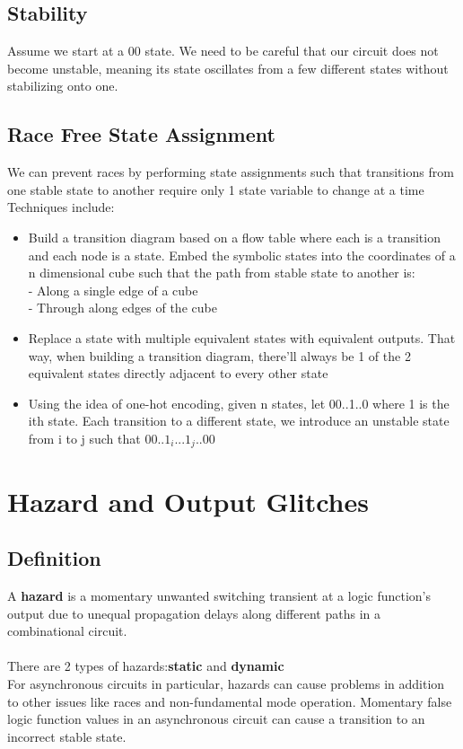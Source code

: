 \documentclass[12pt]{report}
\begin{document}
		\subsection{Stability}
			Assume we start at a 00 state. We need to be careful that our circuit does not become unstable, meaning its state oscillates from a few different states without stabilizing onto one.
		\subsection{Race Free State Assignment}
			We can prevent races by performing state assignments such that transitions from one stable state to another require only 1 state variable to change at a time
			Techniques include:
			\begin{itemize}
				\item Build a transition diagram based on a flow table where each is a transition and each node is a state. Embed the symbolic states into the coordinates of a n dimensional cube such that the path from stable state to another is:\\
					- Along a single edge of a cube\\
					- Through \textbf{}along edges of the cube
				\item Replace a state with multiple equivalent states with equivalent outputs. That way, when building a transition diagram, there'll always be 1 of the 2 equivalent states directly adjacent to every other state
				\item Using the idea of one-hot encoding, given n states, let 00..1..0 where 1 is the ith state. Each transition to a different state, we introduce an unstable state from i to j such that 00..$1_i$...$1_j$..00 
			\end{itemize}
	\section{Hazard and Output Glitches}
		\subsection{Definition}
			A \textbf{hazard} is a momentary unwanted switching transient at a logic function's output due to unequal propagation delays along different paths in a combinational circuit.\\
			\\
			There are 2 types of hazards:\textbf{static} and \textbf{dynamic}\\
			For asynchronous circuits in particular, hazards can cause problems in addition to other issues like races and non-fundamental mode operation. Momentary false logic function values in an asynchronous circuit can cause a transition to an incorrect stable state.
\end{document}
